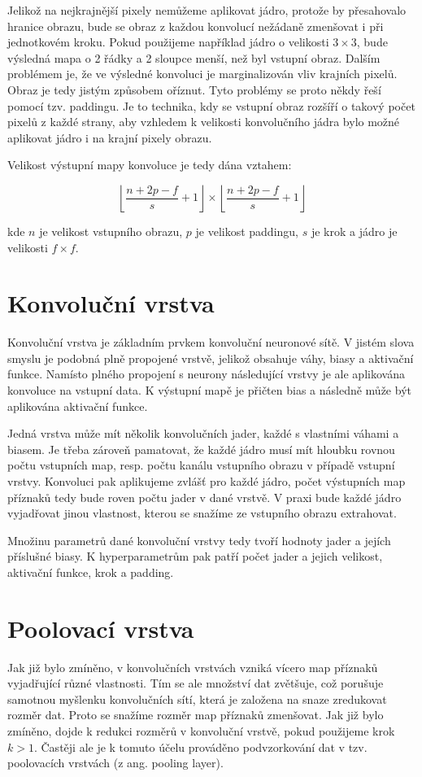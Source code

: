 Jelikož na nejkrajnější pixely nemůžeme aplikovat jádro, protože by přesahovalo
hranice obrazu, bude se obraz z každou konvolucí nežádaně zmenšovat i při
jednotkovém kroku. Pokud použijeme například jádro o velikosti $3 \times 3$,
bude výsledná mapa o 2 řádky a 2 sloupce menší, než byl vstupní obraz. Dalším
problémem je, že ve výsledné konvoluci je marginalizován vliv krajních pixelů.
Obraz je tedy jistým způsobem oříznut. Tyto problémy se proto někdy řeší pomocí
tzv. paddingu. Je to technika, kdy se vstupní obraz rozšíří o takový počet
pixelů z každé strany, aby vzhledem k velikosti konvolučního jádra bylo možné
aplikovat jádro i na krajní pixely obrazu.

Velikost výstupní mapy konvoluce je tedy dána vztahem:

\begin{equation*}
    \left\lfloor \frac{n+2p-f}{s}+1 \right\rfloor \times \left\lfloor \frac{n+2p-f}{s}+1 \right\rfloor
\end{equation*}

kde $n$ je velikost vstupního obrazu, $p$ je velikost paddingu, $s$ je krok a
jádro je velikosti $f \times f$.

\section{Konvoluční vrstva}

Konvoluční vrstva je základním prvkem konvoluční neuronové sítě. V jistém slova
smyslu je podobná plně propojené vrstvě, jelikož obsahuje váhy, biasy a
aktivační funkce. Namísto plného propojení s neurony následující vrstvy je ale
aplikována konvoluce na vstupní data. K výstupní mapě je přičten bias a
následně může být aplikována aktivační funkce.

Jedná vrstva může mít několik konvolučních jader, každé s vlastními váhami a
biasem. Je třeba zároveň pamatovat, že každé jádro musí mít hloubku rovnou
počtu vstupních map, resp. počtu kanálu vstupního obrazu v případě vstupní
vrstvy. Konvoluci pak aplikujeme zvlášť pro každé jádro, počet výstupních map
příznaků tedy bude roven počtu jader v dané vrstvě. V praxi bude každé jádro
vyjadřovat jinou vlastnost, kterou se snažíme ze vstupního obrazu extrahovat.

Množinu parametrů dané konvoluční vrstvy tedy tvoří hodnoty jader a jejích
příslušné biasy. K hyperparametrům pak patří počet jader a jejich velikost,
aktivační funkce, krok a padding.

\section{Poolovací vrstva}
Jak již bylo zmíněno, v konvolučních vrstvách vzniká vícero map příznaků
vyjadřující různé vlastnosti. Tím se ale množství dat zvětšuje, což porušuje
samotnou myšlenku konvolučních sítí, která je založena na snaze zredukovat
rozměr dat. Proto se snažíme rozměr map příznaků zmenšovat. Jak již bylo
zmíněno, dojde k redukci rozměrů v konvoluční vrstvě, pokud použijeme krok $k >
    1$. Častěji ale je k tomuto účelu prováděno podvzorkování dat v tzv.
poolovacích vrstvách (z ang. pooling layer).

